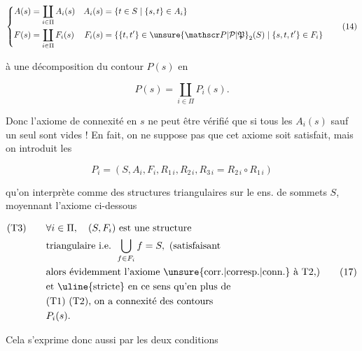 
\[
\left\{\begin{aligned}
 A(s)&=\coprod_{i\in\Pi}A_i(s)& A_i(s)&=\{t\in S\mid\{s,t\}\in A_i\}\\
 F(s)&=\coprod_{i\in\Pi}F_i(s)& F_i(s)&=\{\{t,t'\}\in\unsure{\mathscr P|\mathcal P|\mathfrak P}_2(S)\mid\{s,t,t'\}\in F_i\}
\end{aligned}\right.\tag*{(14)}
\]

  à une décomposition du contour $P(s)$ en

\[
P(s)=\coprod_{i\in\Pi}P_i(s).\tag*{(15)}
\]

Donc l'axiome de connexité en $s$ ne peut être vérifié que si tous les $A_i(s)$ sauf un seul sont vides !  En fait, on ne suppose pas que cet axiome soit satisfait, mais on introduit les

\[
P_i=(S,A_i,F_i,R_{1\,i},R_{2\,i},R_{3\,i}=R_{2\,i}\circ R_{1\,i})\tag*{(16)}
\]

qu'on interprète comme des structures triangulaires sur le \unsure{$\simeq$|$=$} ens. de sommets $S$, moyennant l'axiome ci-dessous

\[
\begin{aligned}
 (\mathrm{T3})\qquad&\forall i\in\Pi,\quad(S,F_i)\text{ est une structure}\\
 &\text{triangulaire i.e. }\bigcup_{f\in F_i}f=S,\ \text{(satisfaisant}\\
 &\text{alors évidemment l'axiome \unsure{corr.|corresp.|conn.} à T2,)}\\
 &\text{et \uline{stricte} en ce sens qu'en plus de}\\
 &\text{(T1) (T2), on a connexité des contours}\\
 &P_i(s).
\end{aligned}\tag*{(17)}
\]

Cela s'exprime donc aussi par les deux conditions
